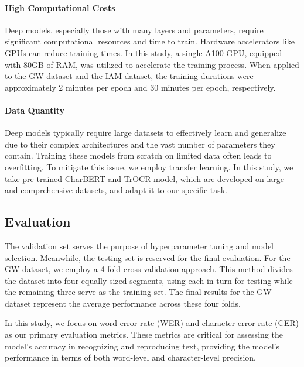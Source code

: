 \paragraph*{High Computational Costs}
\label{par:3_high_computational_costs}
Deep models, especially those with many layers and parameters, require significant computational resources and time to train. Hardware accelerators like GPUs can reduce training times. In this study, a single A100 GPU, equipped with 80GB of RAM, was utilized to accelerate the training process. When applied to the GW dataset and the IAM dataset, the training durations were approximately 2 minutes per epoch and 30 minutes per epoch, respectively.

\paragraph*{Data Quantity}
\label{par:3_data_quantity}
Deep models typically require large datasets to effectively learn and generalize due to their complex architectures and the vast number of parameters they contain. Training these models from scratch on limited data often leads to overfitting. To mitigate this issue, we employ transfer learning. In this study, we take pre-trained CharBERT and TrOCR model, which are developed on large and comprehensive datasets, and adapt it to our specific task. 

\subsection{Evaluation}
\label{subsec:3_evaluation}
The validation set serves the purpose of hyperparameter tuning and model selection. Meanwhile, the testing set is reserved for the final evaluation. For the GW dataset, we employ a 4-fold cross-validation approach. This method divides the dataset into four equally sized segments, using each in turn for testing while the remaining three serve as the training set. The final results for the GW dataset represent the average performance across these four folds.

In this study, we focus on word error rate (WER) and character error rate (CER) as our primary evaluation metrics. These metrics are critical for assessing the model's accuracy in recognizing and reproducing text, providing the model's performance in terms of both word-level and character-level precision.
